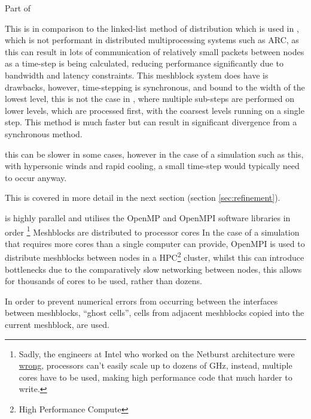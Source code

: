 
Part of 

This is in comparison to the linked-list method of distribution which is used in \mg{}, which is not performant in distributed multiprocessing systems such as ARC, as this can result in lots of communication of relatively small packets between nodes as a time-step is being calculated, reducing performance significantly due to bandwidth and latency constraints.
This meshblock system does have is drawbacks, however, time-stepping is synchronous, and bound to the width of the lowest level, this is not the case in \mg{}, where multiple sub-steps are performed on lower levels, which are processed first, with the coarsest levels running on a single step.
This method is much faster but can result in significant divergence from a synchronous method.

this can be slower in some cases, however in the case of a simulation such as this, with hypersonic winds and rapid cooling, a small time-step would typically need to occur anyway.





This is covered in more detail in the next section (section \ref{sec:refinement}).


\athena{} is highly parallel and utilises the OpenMP and OpenMPI software libraries in order \footnote{Sadly, the engineers at Intel who worked on the Netburst architecture were \href{https://web.archive.org/web/20210412001459/https://www.anandtech.com/show/680/6}{wrong}, processors can't easily scale up to dozens of \si{\giga\hertz}, instead, multiple cores have to be used, making high performance code that much harder to write.}
%
Meshblocks are distributed to processor cores 
In the case of a simulation that requires more cores than a single computer can provide, OpenMPI is used to distribute meshblocks between nodes in a HPC\footnote{High Performance Compute} cluster, whilst this can introduce bottlenecks due to the comparatively slow networking between nodes, this allows for thousands of cores to be used, rather than dozens.

In order to prevent numerical errors from occurring between the interfaces between meshblocks, ``ghost cells'', cells from adjacent meshblocks copied into the current meshblock, are used.

